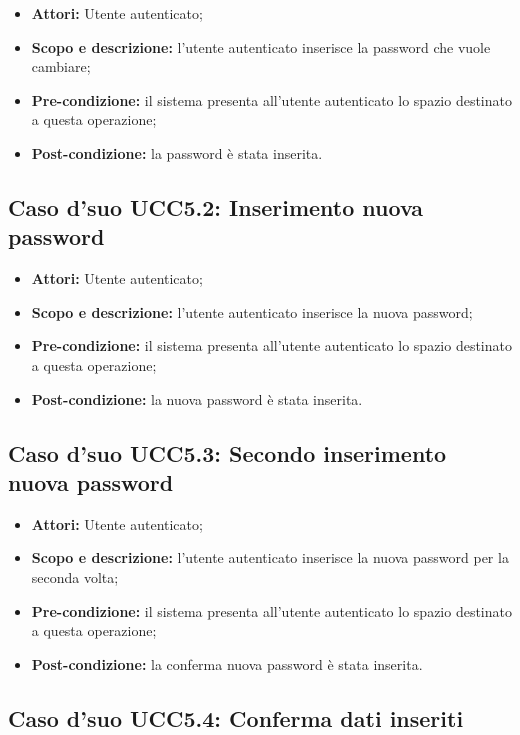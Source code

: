 \begin{itemize}
\item \textbf{Attori:} Utente autenticato;
\item \textbf{Scopo e descrizione:} l'utente autenticato inserisce la password che vuole cambiare;
\item \textbf{Pre-condizione:} il sistema presenta all'utente autenticato lo spazio destinato a questa operazione;
\item \textbf{Post-condizione:} la password è stata inserita.
\end{itemize}

\subsection{Caso d'suo UCC5.2: Inserimento nuova password}

\begin{itemize}
\item \textbf{Attori:} Utente autenticato;
\item \textbf{Scopo e descrizione:} l'utente autenticato inserisce la nuova password;
\item \textbf{Pre-condizione:} il sistema presenta all'utente autenticato lo spazio destinato a questa operazione;
\item \textbf{Post-condizione:} la nuova password è stata inserita.
\end{itemize}

\subsection{Caso d'suo UCC5.3: Secondo inserimento nuova password}

\begin{itemize}
\item \textbf{Attori:} Utente autenticato;
\item \textbf{Scopo e descrizione:} l'utente autenticato inserisce la nuova password per la seconda volta;
\item \textbf{Pre-condizione:} il sistema presenta all'utente autenticato lo spazio destinato a questa operazione;
\item \textbf{Post-condizione:} la conferma nuova password è stata inserita.
\end{itemize}

\subsection{Caso d'suo UCC5.4: Conferma dati inseriti}

